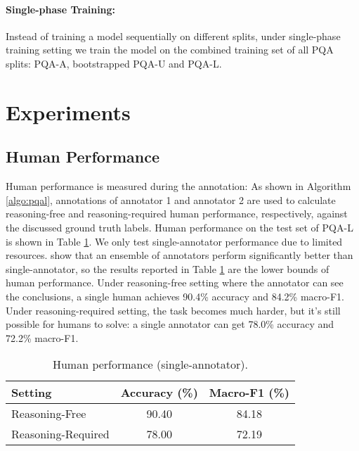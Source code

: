 \documentclass[11pt,a4paper]{article}
\begin{document}
\paragraph{Single-phase Training:}
Instead of training a model sequentially on different splits, under single-phase training setting we train the model on the combined training set of all PQA splits: PQA-A, bootstrapped PQA-U and PQA-L.


\section{Experiments}

\subsection{Human Performance} \label{human}
Human performance is measured during the annotation: As shown in Algorithm \ref{algo:pqal}, annotations of annotator 1 and annotator 2 are used to calculate reasoning-free and reasoning-required human performance, respectively, against the discussed ground truth labels. Human performance on the test set of PQA-L is shown in Table \ref{tab:human}. We only test single-annotator performance due to limited resources. \citet{kwiatkowski2019natural} show that an ensemble of annotators perform significantly better than single-annotator, so the results reported in Table \ref{tab:human} are the lower bounds of human performance. Under reasoning-free setting where the annotator can see the conclusions, a single human achieves 90.4\% accuracy and 84.2\% macro-F1. Under reasoning-required setting, the task becomes much harder, but it's still possible for humans to solve: a single annotator can get 78.0\% accuracy and 72.2\% macro-F1.
\begin{table}[htbp]
\centering
\small
\begin{tabular}{lcc}
\toprule
\textbf{Setting} & \textbf{Accuracy (\%)} & \textbf{Macro-F1 (\%)} \\
\midrule
Reasoning-Free & 90.40 & 84.18 \\
Reasoning-Required & 78.00 & 72.19 \\
\bottomrule
\end{tabular}
\vskip -0.15cm
\caption{Human performance (single-annotator).}
\label{tab:human}
\end{table}
\end{document}
